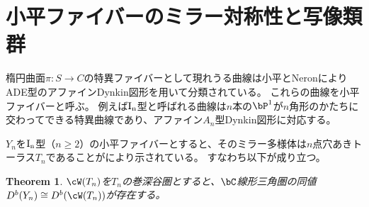 \documentclass[uplatex,a4paper,dvipdfmx]{jsarticle}
\theoremstyle{plain}
\newtheorem{theorem}{Theorem}[section]
\theoremstyle{definition}
\begin{document}
\section{小平ファイバーのミラー対称性と写像類群}
楕円曲面$\pi \colon S \to C$の特異ファイバーとして現れうる曲線は小平とNeronによりADE型のアファインDynkin図形を用いて分類されている。
これらの曲線を小平ファイバーと呼ぶ。
例えば$\rm{I}_n$型と呼ばれる曲線は$n$本の$\bP^1$が$n$角形のかたちに交わってできる特異曲線であり、アファイン$A_n$型Dynkin図形に対応する。



$Y_n$を$\rm{I}_n$型（$n \geq 2$）の小平ファイバーとすると、そのミラー多様体は$n$点穴あきトーラス$T_n$であることが\cite{MR3663596}により示されている。
すなわち以下が成り立つ。
\begin{theorem}\cite{MR3663596}
	$\cW(T_n)$を$T_n$の巻深谷圏とすると、$\bC$線形三角圏の同値$D^b(Y_n) \cong D^b(\cW(T_n))$が存在する。
\end{theorem}
\end{document}
